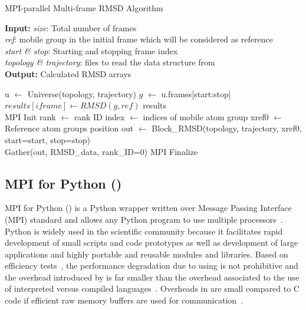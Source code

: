 \begin{algorithm}[ht!]
	\scriptsize
	\caption{MPI-parallel Multi-frame RMSD Algorithm}
	\label{alg:RMSD}
	\hspace*{\algorithmicindent} \textbf{Input:} \emph{size}: Total number of frames \\
	\hspace*{\algorithmicindent} \emph{ref}: mobile group in the initial frame which will be considered as reference \\
	\hspace*{\algorithmicindent} \emph{start \& stop}: Starting and stopping frame index\\
	\hspace*{\algorithmicindent} \emph{topology \& trajectory}: files to read the data structure from \\
	\hspace*{\algorithmicindent} \textbf{Output:} Calculated RMSD arrays
	\begin{algorithmic}[1]
		\State u $\leftarrow$ Universe(topology, trajectory)
		\State $g$ $\leftarrow$ u.frames[start:stop]
		\State $results[iframe] \leftarrow RMSD(g, ref)$
		\EndFor
		\State \Return results
		\EndProcedure
		\\        
		\State MPI Init
		\State rank $\leftarrow$ rank ID
		\State index $\leftarrow$ indices of mobile atom group
		\State xref0 $\leftarrow$ Reference atom group\textsc{}s position
		\State out $\leftarrow$ Block\_RMSD(topology, trajectory, xref0, start=start, stop=stop)
		\\
		\State Gather(out, RMSD\_data, rank\_ID=0)
		\State MPI Finalize
	\end{algorithmic}
\end{algorithm}

\subsection{MPI for Python ()}
MPI for Python () is a Python wrapper written over Message Passing Interface (MPI) standard and allows any Python program to use multiple processors~\cite{Dalcin:2011aa, Dalcin:2005aa}.
Python is widely used in the scientific community because it facilitates rapid development of small scripts and code prototypes as well as development of large applications and highly portable and reusable modules and libraries.
Based on efficiency tests~\cite{Dalcin:2011aa, Dalcin:2005aa}, the performance degradation due to using  is not prohibitive and the overhead introduced by  is far smaller than the overhead associated to the use of interpreted versus compiled languages~\cite{GAiN}.
Overheads in  are small compared to C code if efficient raw memory buffers are used for communication~\cite{Dalcin:2011aa}.

